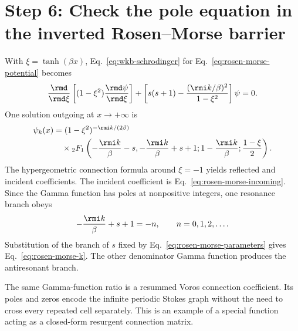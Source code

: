 \section{Step 6: Check the pole equation in the inverted Rosen--Morse barrier}
\label{app:rosen-morse}

With $\xi=\tanh(\beta x)$, Eq.~\eqref{eq:wkb-schrodinger} for
Eq.~\eqref{eq:rosen-morse-potential} becomes
\begin{equation}
  \frac{\rmd}{\rmd\xi}
  \left[(1-\xi^2)\frac{\rmd\psi}{\rmd\xi}\right]
  +\left[
  s(s+1)
  -\frac{(\rmi k/\beta)^2}{1-\xi^2}
  \right]\psi=0 .
  \label{eq:associated-legendre-rm}
\end{equation}
One solution outgoing at $x\to+\infty$ is
\begin{align}
  \psi_k(x)
  &=(1-\xi^2)^{-\rmi k/(2\beta)}
  \notag\\
  &\quad\times
  {}_2F_1\left(
  -\frac{\rmi k}{\beta}-s,
  -\frac{\rmi k}{\beta}+s+1;
  1-\frac{\rmi k}{\beta};
  \frac{1-\xi}{2}
  \right) .
  \label{eq:rm-hypergeometric}
\end{align}
The hypergeometric connection formula around $\xi=-1$ yields reflected and
incident coefficients.  The incident coefficient is
Eq.~\eqref{eq:rosen-morse-incoming}.  Since the Gamma function has poles at
nonpositive integers, one resonance branch obeys
\begin{equation}
  -\frac{\rmi k}{\beta}+s+1=-n,
  \qquad n=0,1,2,\ldots .
  \label{eq:rm-gamma-condition}
\end{equation}
Substitution of the branch of $s$ fixed by
Eq.~\eqref{eq:rosen-morse-parameters} gives
Eq.~\eqref{eq:rosen-morse-k}.  The other denominator Gamma function produces
the antiresonant branch.

The same Gamma-function ratio is a resummed Voros connection coefficient.
Its poles and zeros encode the infinite periodic Stokes graph without the need
to cross every repeated cell separately.  This is an example of a special
function acting as a closed-form resurgent connection matrix.
